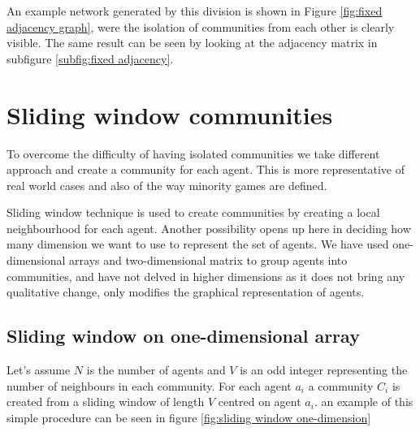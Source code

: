 An example network generated by this division is shown in Figure \ref{fig:fixed adjacency graph}, were the isolation of communities from each other is clearly visible.
The same result can be seen by looking at the adjacency matrix in subfigure \ref{subfig:fixed adjacency}.

\section{Sliding window communities}
\label{sec:sliding communities}

To overcome the difficulty of having isolated communities we take different approach and create a community for each agent.
This is more representative of real world cases and also of the way minority games are defined.

Sliding window technique is used to create communities by creating a local neighbourhood for each agent.
Another possibility opens up here in deciding how many dimension we want to use to represent the set of agents.
We have used one-dimensional arrays and two-dimensional matrix to group agents into communities, and have not delved in higher dimensions as it does not bring any qualitative change, only modifies the graphical representation of agents.

\subsection{Sliding window on one-dimensional array}
\label{subsec:sliding}

Let's assume $N$ is the number of agents and $V$ is an odd integer representing the number of neighbours in each community.
For each agent $a_i$ a community $C_i$ is created from a sliding window of length $V$ centred on agent $a_i$.
an example of this simple procedure can be seen in figure \ref{fig:sliding window one-dimension}



